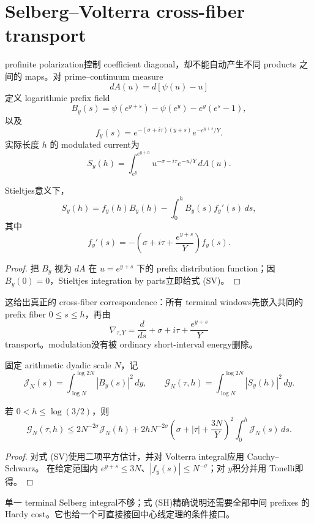 \section{Selberg--Volterra cross-fiber transport}

profinite polarization控制 coefficient diagonal，却不能自动产生不同 products
之间的 maps。对 prime--continuum measure
\[
 dA(u)=d[\psi(u)-u]
\]
定义 logarithmic prefix field
\[
 B_y(s)=\psi(e^{y+s})-\psi(e^y)-e^y(e^s-1),
\]
以及
\[
 f_y(s)=e^{-(\sigma+i\tau)(y+s)}e^{-e^{y+s}/Y}.
\]
实际长度 $h$ 的 modulated current为
\[
 S_y(h)=\int_{e^y}^{e^{y+h}}u^{-\sigma-i\tau}e^{-u/Y}\,dA(u).
\]

\begin{theorem}
Stieltjes意义下，
\[
 S_y(h)=f_y(h)B_y(h)-\int_0^hB_y(s)f_y'(s)\,ds, \tag{SV}
\]
其中
\[
 f_y'(s)=-\left(\sigma+i\tau+\frac{e^{y+s}}Y\right)f_y(s).
\]
\end{theorem}

\begin{proof}
把 $B_y$ 视为 $dA$ 在 $u=e^{y+s}$ 下的 prefix distribution function；因
$B_y(0)=0$，Stieltjes integration by parts立即给式 (SV)。
\end{proof}

这给出真正的 cross-fiber correspondence：所有 terminal windows先嵌入共同的
prefix fiber $0\leq s\leq h$，再由
\[
 \nabla_{\tau,Y}=\frac d{ds}+\sigma+i\tau+\frac{e^{y+s}}Y
\]
transport。modulation没有被 ordinary short-interval energy删除。

固定 arithmetic dyadic scale $N$，记
\[
 \mathcal J_N(s)=\int_{\log N}^{\log 2N}|B_y(s)|^2\,dy,
 \qquad
 \mathcal G_N(\tau,h)=\int_{\log N}^{\log 2N}|S_y(h)|^2\,dy.
\]

\begin{theorem}
若 $0<h\leq\log(3/2)$，则
\[
 \mathcal G_N(\tau,h)
 \leq2N^{-2\sigma}\mathcal J_N(h)
 +2hN^{-2\sigma}
  \left(\sigma+|\tau|+\frac{3N}{Y}\right)^2
  \int_0^h\mathcal J_N(s)\,ds.                 \tag{SH}
\]
\end{theorem}

\begin{proof}
对式 (SV)使用二项平方估计，并对 Volterra integral应用 Cauchy--Schwarz。
在给定范围内 $e^{y+s}\leq3N$、$|f_y(s)|\leq N^{-\sigma}$；对 $y$积分并用
Tonelli即得。
\end{proof}

单一 terminal Selberg integral不够；式 (SH)精确说明还需要全部中间 prefixes
的 Hardy cost。它也给一个可直接接回中心线定理的条件接口。

